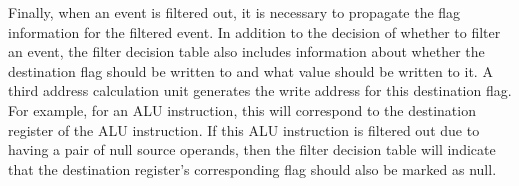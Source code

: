 Finally, when an event is filtered out, it is necessary to propagate the flag
information for the filtered event. In addition to the decision of whether to
filter an event, the filter decision table also includes information about
whether the destination flag should be written to and what value should be
written to it. A third address calculation unit generates the write address for
this destination flag. For example, for an ALU instruction, this will
correspond to the destination register of the ALU instruction. If this ALU
instruction is filtered out due to having a pair of null source operands, then
the filter decision table will indicate that the destination register's
corresponding flag should also be marked as null. 




